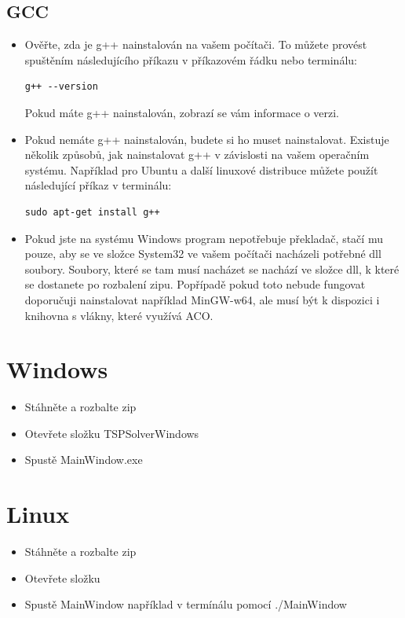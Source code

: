 \subsection{GCC}
\begin{itemize}
\item Ověřte, zda je g++ nainstalován na vašem počítači. To můžete provést spuštěním následujícího příkazu v příkazovém řádku nebo terminálu:
\begin{verbatim}
g++ --version
\end{verbatim}

Pokud máte g++ nainstalován, zobrazí se vám informace o verzi.

\item Pokud nemáte g++ nainstalován, budete si ho muset nainstalovat. Existuje několik způsobů, jak nainstalovat g++ v závislosti na vašem operačním systému. Například pro Ubuntu a další linuxové distribuce můžete použít následující příkaz v terminálu:

\begin{verbatim}
sudo apt-get install g++
\end{verbatim}

\item Pokud jste na systému Windows program nepotřebuje překladač, stačí mu pouze, aby se ve složce System32 ve vašem počítači nacházeli potřebné dll soubory. Soubory, které se tam musí nacházet se nachází ve složce dll, k které se dostanete po rozbalení zipu. Popřípadě pokud toto nebude fungovat doporučuji nainstalovat například MinGW-w64, ale musí být k dispozici i knihovna s vlákny, které využívá ACO. 



\end{itemize}
\section{Windows}
\begin{itemize}
    
    \item Stáhněte a rozbalte zip
    \item Otevřete složku TSPSolverWindows
    \item Spustě MainWindow.exe
\end{itemize}
\section{Linux}
\begin{itemize}
    \item Stáhněte a rozbalte zip
    \item Otevřete složku 
    \item Spustě MainWindow například v termínálu pomocí ./MainWindow
\end{itemize}
